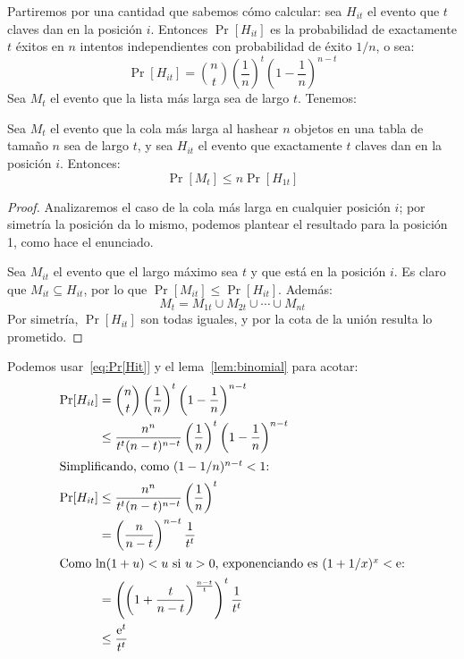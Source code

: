   Partiremos por una cantidad que sabemos cómo calcular:
  sea \(H_{i t}\) el evento que \(t\) claves dan en la posición \(i\).
  Entonces \(\Pr[ H_{i t} ]\) es la probabilidad de exactamente \(t\) éxitos
  en \(n\) intentos independientes con probabilidad de éxito \(1/n\),
  o sea:
  \begin{equation}
    \label{eq:Pr[Hit]}
    \Pr[ H_{i t} ]
      = \binom{n}{t}
         \left( \frac{1}{n} \right)^t \left( 1 - \frac{1}{n} \right)^{n - t}
  \end{equation}
  Sea \(M_t\) el evento que la lista más larga sea de largo \(t\).
  Tenemos:
  \begin{lemma}
    \label{lem:Mt}
    Sea \(M_t\) el evento que la cola más larga al hashear \(n\) objetos
    en una tabla de tamaño \(n\) sea de largo \(t\),
    y sea \(H_{i t}\) el evento que exactamente \(t\) claves
    dan en la posición \(i\).
    Entonces:
    \begin{equation*}
      \Pr[ M_t ]
        \le n \Pr[H_{1 t} ]
    \end{equation*}
  \end{lemma}
  \begin{proof}
    Analizaremos el caso de la cola más larga en cualquier posición \(i\);
    por simetría la posición da lo mismo,
    podemos plantear el resultado para la posición \num{1},
    como hace el enunciado.

    Sea \(M_{i t}\) el evento que el largo máximo sea \(t\)
    y que está en la posición \(i\).
    Es claro que \(M_{i t} \subseteq H_{i t}\),
    por lo que \(\Pr[M_{i t}] \le \Pr[H_{i t}]\).
    Además:
    \begin{equation*}
      M_t
        = M_{1 t} \cup M_{2 t} \cup \dotsb \cup M_{n t}
    \end{equation*}
    Por simetría,
    \(\Pr[H_{i t}]\) son todas iguales,
    y por la cota de la unión
    resulta lo prometido.
  \end{proof}
  Podemos usar~\eqref{eq:Pr[Hit]} y el lema~\ref{lem:binomial}
  para acotar:
  \begin{align*}
    \Pr[H_{i t}]
      &=   \binom{n}{t}
             \left( \frac{1}{n} \right)^t
             \left(1 - \frac{1}{n} \right)^{n - t} \\
      &\le \frac{n^n}{t^t (n - t)^{n - t}}
             \left( \frac{1}{n} \right)^t
             \left(1 - \frac{1}{n} \right)^{n - t} \\
    \intertext{Simplificando,
               como \((1 - 1/n)^{n - t} < 1\):}
    \Pr[H_{i t}]
      &\le \frac{n^n}{t^t (n - t)^{n - t}}
              \left( \frac{1}{n} \right)^t \\
      &=   \left( \frac{n}{n - t} \right)^{n - t} \frac{1}{t^t} \\
    \intertext{Como \(\ln(1 + u) < u\) si \(u > 0\),
               exponenciando es \((1 + 1/x)^x < \mathrm{e}\):}
      &=   \left(
              \left( 1 + \frac{t}{n - t} \right)^{\frac{n - t}{t}}
            \right)^t \frac{1}{t^t} \\
      &\le \frac{\mathrm{e}^t}{t^t}
  \end{align*}
